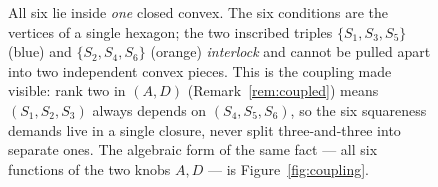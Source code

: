 \documentclass[11pt]{article}
\theoremstyle{definition}
\begin{document}
\begin{figure}[htbp]
\centering
{}
\caption{All six lie inside \emph{one} closed convex. The six conditions are the vertices
of a single hexagon; the two inscribed triples $\{S_1,S_3,S_5\}$ (blue) and
$\{S_2,S_4,S_6\}$ (orange) \emph{interlock} and cannot be pulled apart into two independent
convex pieces. This is the coupling made visible: rank two in $(A,D)$
(Remark~\ref{rem:coupled}) means $(S_1,S_2,S_3)$ always depends on $(S_4,S_5,S_6)$, so the
six squareness demands live in a single closure, never split three-and-three into separate
ones. The algebraic form of the same fact --- all six functions of the two knobs $A,D$ ---
is Figure~\ref{fig:coupling}.}
\label{fig:nohexagon}
\end{figure}
\end{document}

